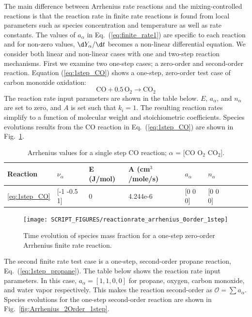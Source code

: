 \documentclass[11pt]{book}
\begin{document}
The main difference between Arrhenius rate reactions and the mixing-controlled reactions is that the reaction rate in finite rate reactions is found from local parameters such as species concentration and temperature as well as rate constants. The values of $a_{\alpha}$ in Eq.~(\ref{eq:finite_rate1}) are specific to each reaction and for non-zero values, $\d Y_{\alpha}/ \d t$ becomes  a non-linear differential equation. We consider both linear and non-linear cases with one and two-step reaction mechanisms. First we examine two one-step cases; a zero-order and second-order reaction. Equation (\ref{eq:1step_CO}) shows a one-step, zero-order test case of carbon monoxide oxidation:
\begin{equation}\label{eq:1step_CO}
\mathrm{CO+0.5 \, O_2 \rightarrow  CO_2}
\end{equation}
The reaction rate input parameters are shown in the table below. $E$, $a_{\alpha}$, and $n_{\alpha}$ are set to zero, and $A$ is set such that ${k}_{i} = 1$. The resulting reaction rates simplify to a function of molecular weight and stoichiometric coefficients. Species evolutions results from the CO reaction in Eq.~(\ref{eq:1step_CO}) are shown in Fig.~\ref{fig:Arrhenius_0Order_1step}.
\begin{table}[ht]
\begin{center}
\caption[Arrhenius values for a single step CO reaction]{Arrhenius values for a single step CO reaction; $\alpha$ = [$\mathrm{CO}$ $\mathrm{O_2}$ $\mathrm{CO_2}$].}
\label{single_step_co}
\begin{tabular}{|l|l|l|l|l|l|l|l|l|}
\hline Reaction & $\nu_{\alpha}$ & E (J/mol) & A (cm$^3$/mole/s) & $a_{\alpha}$ & $n_{\alpha}$  \\ \hline \hline
\ref{eq:1step_CO} & [-1 -0.5 1] & 0 & 4.244e-6 & [0 0 0] & [0 0 0] \\ \hline
\end{tabular}
\end{center}
\end{table}
\begin{figure}[h!]
\centering
\texttt{[image: SCRIPT\_FIGURES/reactionrate\_arrhenius\_0order\_1step]}
\caption[Species evolution in a 0-order 1-step finite rate reaction]{Time evolution of species mass fraction for a one-step zero-order Arrhenius finite rate reaction.}
\label{fig:Arrhenius_0Order_1step}
\end{figure}
The second finite rate test case is a one-step, second-order propane reaction, Eq.~(\ref{eq:1step_propane}). The table below shows the reaction rate input parameters. In this case, $a_{\alpha}=[1,1,0,0]$  for propane, oxygen, carbon monoxide, and water vapor respectively. This makes the reaction second-order as $\mathcal{O}=\sum a_{\alpha}$. Species evolutions for the one-step second-order reaction are shown in Fig.~\ref{fig:Arrhenius_2Order_1step}.
\end{document}
